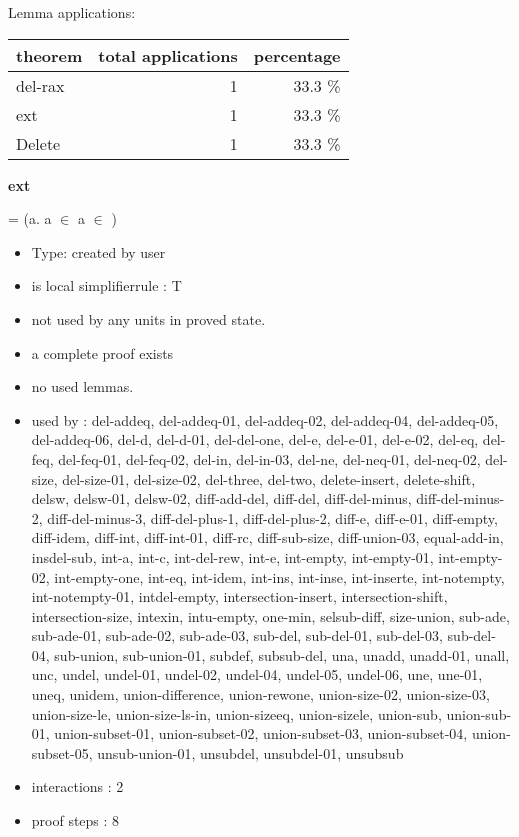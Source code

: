 \documentclass[a4paper]{article}
\begin{document}
Lemma applications:

\begin{supertabular}{l|r|r}
theorem	        & total applications & percentage \\ \hline
del-rax & 1 & 33.3 \% \\
ext & 1 & 33.3 \% \\
Delete & 1 & 33.3 \% \\

\end{supertabular}
\pagebreak

{\LARGE\bf ext}\label{lemma-ext}

\medskip

 \Fol {} =  \Equiv (\All a. a $\in$  \Equiv a $\in$ )

\begin{itemize}

\item Type: created by user

\item is local simplifierrule : T
\item not used by any units in proved state.
\item       a complete proof exists
\item       no used lemmas.
\item       used by      : del-addeq, del-addeq-01, del-addeq-02, del-addeq-04, del-addeq-05, del-addeq-06, del-d, del-d-01, del-del-one, del-e, del-e-01, del-e-02, del-eq, del-feq, del-feq-01, del-feq-02, del-in, del-in-03, del-ne, del-neq-01, del-neq-02, del-size, del-size-01, del-size-02, del-three, del-two, delete-insert, delete-shift, delsw, delsw-01, delsw-02, diff-add-del, diff-del, diff-del-minus, diff-del-minus-2, diff-del-minus-3, diff-del-plus-1, diff-del-plus-2, diff-e, diff-e-01, diff-empty, diff-idem, diff-int, diff-int-01, diff-rc, diff-sub-size, diff-union-03, equal-add-in, insdel-sub, int-a, int-c, int-del-rew, int-e, int-empty, int-empty-01, int-empty-02, int-empty-one, int-eq, int-idem, int-ins, int-inse, int-inserte, int-notempty, int-notempty-01, intdel-empty, intersection-insert, intersection-shift, intersection-size, intexin, intu-empty, one-min, selsub-diff, size-union, sub-ade, sub-ade-01, sub-ade-02, sub-ade-03, sub-del, sub-del-01, sub-del-03, sub-del-04, sub-union, sub-union-01, subdef, subsub-del, una, unadd, unadd-01, unall, unc, undel, undel-01, undel-02, undel-04, undel-05, undel-06, une, une-01, uneq, unidem, union-difference, union-rewone, union-size-02, union-size-03, union-size-le, union-size-ls-in, union-sizeeq, union-sizele, union-sub, union-sub-01, union-subset-01, union-subset-02, union-subset-03, union-subset-04, union-subset-05, unsub-union-01, unsubdel, unsubdel-01, unsubsub
\item       interactions : 2
\item       proof steps  : 8
\end{itemize}
\end{document}
